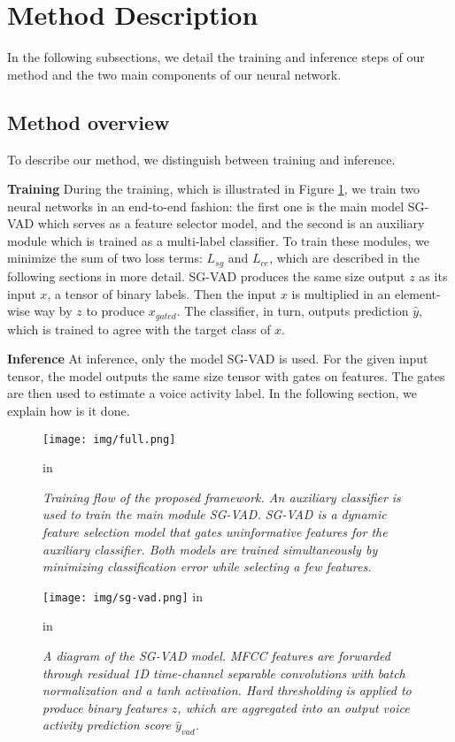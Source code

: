 \documentclass{article}
\begin{document}
\section{Method Description}
In the following subsections, we detail the training and inference steps of our method and the two main components of our neural network.
\subsection{Method overview}

To describe our method, we distinguish between training and inference. 

\textbf{Training} \hspace{5pt} During the training, which is illustrated in Figure \ref{fig:train}, we train two neural networks in an end-to-end fashion: the first one is the main model SG-VAD which serves as a feature selector model, and the second is an auxiliary module which is trained as a multi-label classifier. To train these modules, we minimize the sum of two loss terms: $L_{sg}$ and $L_{ce}$, which are described in the following sections in more detail. SG-VAD produces the same size output $z$ as its input $x$, a tensor of binary labels. Then the input $x$ is multiplied in an element-wise way by $z$ to produce $x_{gated}$. The classifier, in turn, outputs prediction $\hat{y}$, which is trained to agree with the target class of $x$.

\textbf{Inference} \hspace{5pt} At inference, only the model SG-VAD is used. For the given input tensor, the model outputs the same size tensor with gates on features. The gates are then used to estimate a voice activity label. In the following section, we explain how is it done.

\begin{figure}
  \centering
    \texttt{[image: img/full.png]}
    \caption{\textit{Training flow of the proposed framework. An auxiliary classifier is used to train the main module SG-VAD. SG-VAD is a dynamic feature selection model that gates uninformative features for the auxiliary classifier. Both models are trained simultaneously by minimizing classification error while selecting a few features. }}
    \label{fig:train}
          in
\end{figure}

\begin{figure}[t]
  \centering
    \texttt{[image: img/sg-vad.png]}
     in
    \caption{\textit{A diagram of the SG-VAD model. MFCC features are forwarded through residual 1D time-channel separable convolutions with batch normalization and a tanh activation. Hard thresholding is applied to produce binary features $z$, which are aggregated into an output voice activity prediction score $\hat{y}_{vad}$.}}
    \label{fig:proposed}
      in
\end{figure}
\end{document}
